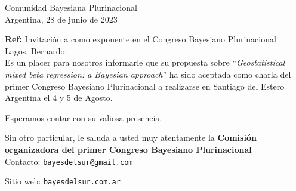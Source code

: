\documentclass[a4paper,11pt]{article}
\begin{document}
\begin{flushright}
Comunidad Bayesiana Plurinacional \\
Argentina, 28 de junio de 2023
\end{flushright} 

\vspace{0.1cm}
\noindent

\hfill \textbf{Ref:} Invitación a como exponente en el Congreso Bayesiano Plurinacional \\

\noindent Lagos, Bernardo:\\

\indent Es un placer para nosotros informarle que su propuesta sobre ``\emph{Geostatistical mixed beta regression: a Bayesian approach}'' ha sido aceptada como charla del primer Congreso Bayesiano Plurinacional a realizarse en Santiago del Estero Argentina el 4 y 5 de Agosto.

\vspace{0.3cm}

\indent Esperamos contar con su valiosa presencia.

\vspace{0.3cm}

\indent Sin otro particular, le saluda a usted muy atentamente la \textbf{Comisión organizadora del primer Congreso Bayesiano Plurinacional}\\

 \vspace{0.8cm}
\small
 Contacto: \texttt{bayesdelsur@gmail.com}

 Sitio web: \texttt{bayesdelsur.com.ar}
\end{document}
